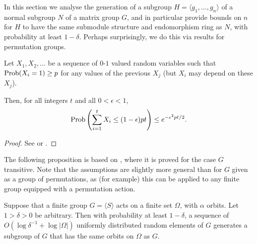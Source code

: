 In this section we analyse the generation 
of a subgroup $H = \langle g_1, \ldots, g_n \rangle$ 
of a normal subgroup $N$ of a matrix group 
$G$, and in particular provide bounds on $n$ 
for $H$ to have the same submodule structure and endomorphism ring as $N$, with probability at least $1 - \delta$.
Perhaps surprisingly, we do this via results for permutation groups. 


\begin{Lemm} %
    \label{babailemma}
    Let $X_1, X_2, \ldots$ be a sequence of\/ $0$-$1$ valued random
    variables such that $\Pro(X_i = 1) \ge p$ for any values of the
    previous $X_j$ (but $X_i$ may depend on these $X_j$). 
    
    Then, for
    all integers $t$ and all\/ $0 < \epsilon < 1$,
    \[ \Pro\left( \sum_{i=1}^t X_i \le (1-\epsilon)pt\right) \le
       e^{-\epsilon^2pt/2}. \]
   \end{Lemm}

\begin{proof} See \cite[Corollary 2.2]{babai95} or \cite[Lemma
    2.3.3]{Ser}.
\end{proof}

The following proposition is based on \cite[2.3.7]{Ser}, where it is    
proved for the case $G$ transitive. Note that the assumptions are       
slightly more general than for $G$ given as a group of permutations, as 
(for example) this can be applied to any finite group equipped with a   
permutation action.                                                     

\begin{Prop}  \label{prop:orbits}
Suppose that a finite group $G = \langle S \rangle$ 
acts on a finite set $\Omega$, with $\alpha$ 
orbits. Let $1 > \delta > 0$ be arbitrary. 
Then with probability at least $1 - \delta$, a sequence
of $O(\log \delta^{-1} + \log |\Omega|)$ 
uniformly distributed random elements of $G$ 
generates a subgroup of $G$ that has the same 
orbits on $\Omega$ as $G$.
\end{Prop}

